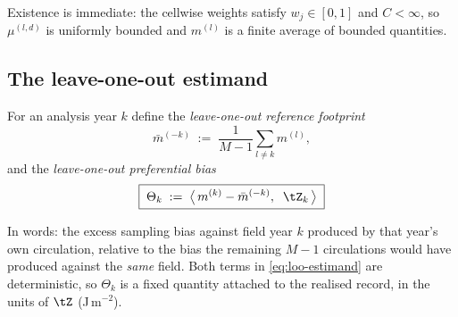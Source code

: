 \noindent
Existence is immediate: the cellwise weights satisfy $w_j \in [0,1]$ and $C < \infty$, so
$\mu^{(l,d)}$ is uniformly bounded and $m^{(l)}$ is a finite average of bounded quantities.

\subsection{The leave-one-out estimand}
\label{sec:loo-estimand}

\begin{definition}
\label{def:loo}
For an analysis year $k$ define the \emph{leave-one-out reference footprint}
\begin{equation}
  \bar{m}^{(-k)} \;:=\; \frac{1}{M-1}\sum_{l \neq k} m^{(l)} ,
\end{equation}
and the \emph{leave-one-out preferential bias}
\begin{equation}
  \label{eq:loo-estimand}
  \boxed{\;\Theta_k \;:=\; \big\langle\, m^{(k)} - \bar{m}^{(-k)},\;\; \tZ_k \,\big\rangle \;}
\end{equation}
\end{definition}

\noindent
In words: the excess sampling bias against field year $k$ produced by that year's own circulation,
relative to the bias the remaining $M-1$ circulations would have produced against the \emph{same}
field. Both terms in \eqref{eq:loo-estimand} are deterministic, so $\Theta_k$ is a fixed quantity
attached to the realised record, in the units of $\tZ$ (J\,m$^{-2}$).

